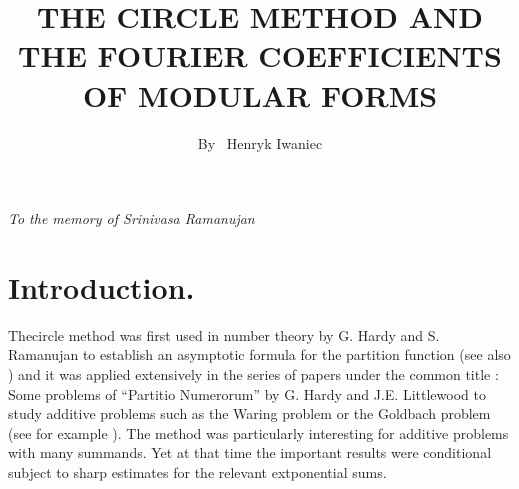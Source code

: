 
\title{THE CIRCLE METHOD AND THE FOURIER COEFFICIENTS OF MODULAR FORMS}

\author{By~ Henryk Iwaniec}

\date{}
\maketitle

\setcounter{page}{52} 
\setcounter{pageoriginal}{46} 

\hfill \textit{To the memory of Srinivasa Ramanujan}

\section{Introduction.}\label{art6-sec1} The\pageoriginale circle method was first used in number theory by G. Hardy and S. Ramanujan \cite{art6-key2} to establish an asymptotic formula for the partition function (see also \cite{art6-key7}) and it was applied extensively in the series of papers under the common title : Some problems of ``Partitio Numerorum'' by G. Hardy and J.E. Littlewood to study additive problems such as the Waring problem or the Goldbach problem (see for example \cite{art6-key1}). The method was particularly interesting for additive problems with many summands. Yet at that time the important results were conditional subject to sharp estimates for the relevant extponential sums.

